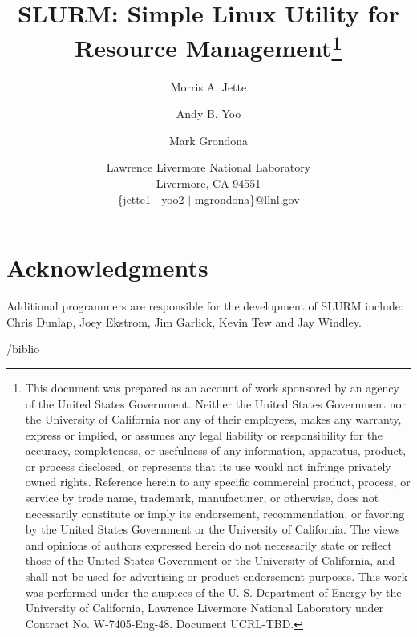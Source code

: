 \documentclass[11pt]{article}
\title{SLURM: Simple Linux Utility for Resource Management\thanks{
This document was prepared as an account of work sponsored by an
agency of the United States Government.  Neither the United States
Government nor the University of California nor any of their
employees, makes any warranty, express or implied, or assumes any
legal liability or responsibility for the accuracy, completeness, or
usefulness of any information, apparatus, product, or process
disclosed, or represents that its use would not infringe privately
owned rights. Reference herein to any specific commercial product,
process, or service by trade name, trademark, manufacturer, or
otherwise, does not necessarily constitute or imply its endorsement,
recommendation, or favoring by the United States Government or the
University of California.  The views and opinions of authors expressed
herein do not necessarily state or reflect those of the United States
Government or the University of California, and shall not be used for
advertising or product endorsement purposes.
This work was performed under the auspices of the U. S. Department of
Energy by the University of California, Lawrence Livermore National
Laboratory under Contract No. W-7405-Eng-48. Document UCRL-TBD.}}
\author{Morris A. Jette \and Andy B. Yoo \and Mark Grondona}
\date{Lawrence Livermore National Laboratory\\
Livermore, CA 94551\\
\{jette1 $\mid$ yoo2 $\mid$ mgrondona\}@llnl.gov}
\begin{document}
\maketitle







%



\section*{Acknowledgments}

Additional programmers are responsible for the development of 
SLURM include: Chris Dunlap, Joey Ekstrom, Jim Garlick, Kevin Tew
and Jay Windley.

\newpage


/biblio
\end{document}
